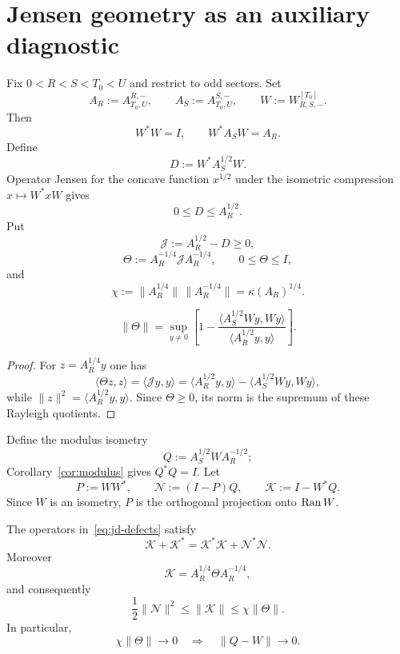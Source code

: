 
\section{Jensen geometry as an auxiliary diagnostic}\label{sec:jensen}

Fix $0<R<S<T_0<U$ and restrict to odd sectors.  Set
\[
 A_R:=A_{T_0,U}^{R,-},
 \qquad
 A_S:=A_{T_0,U}^{S,-},
 \qquad
 W:=W_{R,S,-}^{[T_0]}.
\]
Then
\[
 W^*W=I,
 \qquad
 W^*A_SW=A_R.
\tag{JD.1}\label{eq:jd-compression}
\]
Define
\[
 D:=W^*A_S^{1/2}W.
\]
Operator Jensen for the concave function $x^{1/2}$ under the isometric compression
$x\mapsto W^*xW$ gives
\[
 0\le D\le A_R^{1/2}.
\tag{JD.2}\label{eq:jd-jensen}
\]
Put
\[
 \mathscr J:=A_R^{1/2}-D\ge0,
\]
\[
 \boxed{
 \Theta:=A_R^{-1/4}\mathscr J A_R^{-1/4},
 \qquad 0\le\Theta\le I,
 }
\tag{JD.3}\label{eq:jd-theta}
\]
and
\[
 \chi:=\|A_R^{1/4}\|\,\|A_R^{-1/4}\|=\kappa(A_R)^{1/4}.
\tag{JD.4}\label{eq:jd-chi}
\]

\begin{proposition}\label{prop:jensen}
\[
 \boxed{
 \|\Theta\|
 =\sup_{y\ne0}
 \left[
 1-
 \frac{\langle A_S^{1/2}Wy,Wy\rangle}
      {\langle A_R^{1/2}y,y\rangle}
 \right].
 }
\tag{JD.5}\label{eq:jd-rayleigh}
\]
\end{proposition}

\begin{proof}
For $z=A_R^{1/4}y$ one has
\[
 \langle\Theta z,z\rangle
 =\langle\mathscr Jy,y\rangle
 =\langle A_R^{1/2}y,y\rangle
  -\langle A_S^{1/2}Wy,Wy\rangle,
\]
while
$\|z\|^2=\langle A_R^{1/2}y,y\rangle$.  Since $\Theta\ge0$, its norm is the supremum
of these Rayleigh quotients.
\end{proof}

Define the modulus isometry
\[
 Q:=A_S^{1/2}WA_R^{-1/2};
\]
Corollary~\ref{cor:modulus} gives $Q^*Q=I$.  Let
\[
 P:=WW^*,
 \qquad
 \mathscr N:=(I-P)Q,
 \qquad
 \mathscr K:=I-W^*Q.
\tag{JD.6}\label{eq:jd-defects}
\]
Since $W$ is an isometry, $P$ is the orthogonal projection onto $\operatorname{Ran} W$.

\begin{proposition}\label{prop:jensen-defect}
The operators in~\eqref{eq:jd-defects} satisfy
\[
 \boxed{
 \mathscr K+\mathscr K^*
 =\mathscr K^*\mathscr K+\mathscr N^*\mathscr N.
 }
\tag{JD.7}\label{eq:jd-balance}
\]
Moreover
\[
 \boxed{
 \mathscr K=A_R^{1/4}\Theta A_R^{-1/4},
 }
\tag{JD.8}\label{eq:jd-Ktheta}
\]
and consequently
\[
 \boxed{
 \frac12\|\mathscr N\|^2
 \le\|\mathscr K\|
 \le\chi\|\Theta\|.
 }
\tag{JD.9}\label{eq:jd-defect-bound}
\]
In particular,
\[
 \chi\|\Theta\|\to0
 \quad\Longrightarrow\quad
 \|Q-W\|\to0.
\tag{JD.10}\label{eq:jd-sufficient}
\]
\end{proposition}

